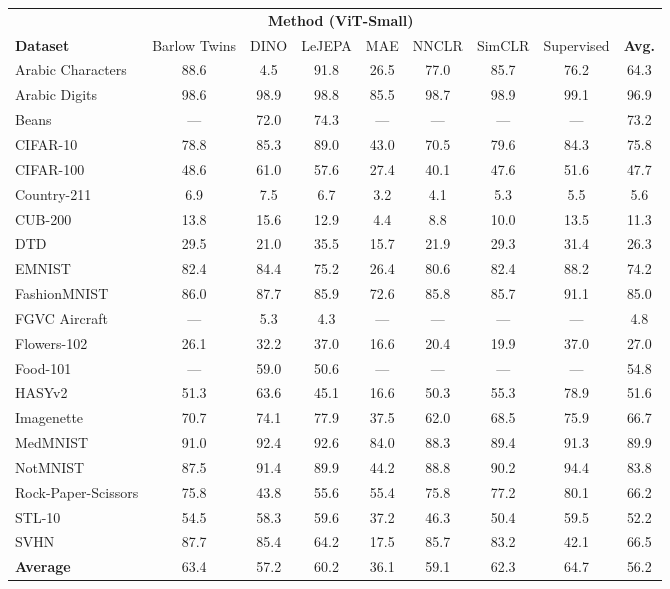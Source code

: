 \begin{tabular}{l c c c c c c c c}
\toprule
 & \multicolumn{6}{c}{\textbf{Method (ViT-Small)}} & & \\
\cmidrule(lr){2-7}
\textbf{Dataset} & Barlow Twins & DINO & LeJEPA & MAE & NNCLR & SimCLR & Supervised & \textbf{Avg.} \\
\midrule
Arabic Characters & 88.6 & 4.5 & 91.8 & 26.5 & 77.0 & 85.7 & 76.2 & 64.3 \\
Arabic Digits & 98.6 & 98.9 & 98.8 & 85.5 & 98.7 & 98.9 & 99.1 & 96.9 \\
Beans & --- & 72.0 & 74.3 & --- & --- & --- & --- & 73.2 \\
CIFAR-10 & 78.8 & 85.3 & 89.0 & 43.0 & 70.5 & 79.6 & 84.3 & 75.8 \\
CIFAR-100 & 48.6 & 61.0 & 57.6 & 27.4 & 40.1 & 47.6 & 51.6 & 47.7 \\
Country-211 & 6.9 & 7.5 & 6.7 & 3.2 & 4.1 & 5.3 & 5.5 & 5.6 \\
CUB-200 & 13.8 & 15.6 & 12.9 & 4.4 & 8.8 & 10.0 & 13.5 & 11.3 \\
DTD & 29.5 & 21.0 & 35.5 & 15.7 & 21.9 & 29.3 & 31.4 & 26.3 \\
EMNIST & 82.4 & 84.4 & 75.2 & 26.4 & 80.6 & 82.4 & 88.2 & 74.2 \\
FashionMNIST & 86.0 & 87.7 & 85.9 & 72.6 & 85.8 & 85.7 & 91.1 & 85.0 \\
FGVC Aircraft & --- & 5.3 & 4.3 & --- & --- & --- & --- & 4.8 \\
Flowers-102 & 26.1 & 32.2 & 37.0 & 16.6 & 20.4 & 19.9 & 37.0 & 27.0 \\
Food-101 & --- & 59.0 & 50.6 & --- & --- & --- & --- & 54.8 \\
HASYv2 & 51.3 & 63.6 & 45.1 & 16.6 & 50.3 & 55.3 & 78.9 & 51.6 \\
Imagenette & 70.7 & 74.1 & 77.9 & 37.5 & 62.0 & 68.5 & 75.9 & 66.7 \\
MedMNIST & 91.0 & 92.4 & 92.6 & 84.0 & 88.3 & 89.4 & 91.3 & 89.9 \\
NotMNIST & 87.5 & 91.4 & 89.9 & 44.2 & 88.8 & 90.2 & 94.4 & 83.8 \\
Rock-Paper-Scissors & 75.8 & 43.8 & 55.6 & 55.4 & 75.8 & 77.2 & 80.1 & 66.2 \\
STL-10 & 54.5 & 58.3 & 59.6 & 37.2 & 46.3 & 50.4 & 59.5 & 52.2 \\
SVHN & 87.7 & 85.4 & 64.2 & 17.5 & 85.7 & 83.2 & 42.1 & 66.5 \\
\midrule
\textbf{Average} & 63.4 & 57.2 & 60.2 & 36.1 & 59.1 & 62.3 & 64.7 & 56.2 \\
\bottomrule
\end{tabular}
